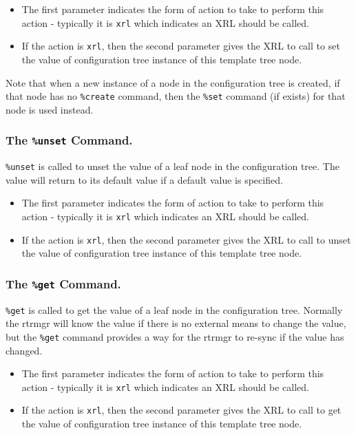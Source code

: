 \documentclass[11pt]{article}
\begin{document}
\begin{itemize}

  \item The first parameter indicates the form of action to take to perform
this action - typically it is {\tt xrl} which indicates an XRL should
be called.

  \item If the action is {\tt xrl}, then the second parameter gives the XRL to
call to set the value of configuration tree instance of this template
tree node.

\end{itemize}

Note that when a new instance of a node in the configuration tree is created,
if that node has no {\tt \%create} command, then the {\tt \%set}
command (if exists) for that node is used instead.

\subsubsection{The {\tt \%unset} Command.}
{\tt \%unset} is called to unset the value of a leaf node in the
configuration tree.  The value will return to its default value if a
default value is specified.

\begin{itemize}
  \item The first parameter indicates the form of action to take to perform
this action - typically it is {\tt xrl} which indicates an XRL should
be called.

  \item If the action is {\tt xrl}, then the second parameter gives the XRL to
call to unset the value of configuration tree instance of this template
tree node.

\end{itemize}

\subsubsection{The {\tt \%get} Command.}
{\tt \%get} is called to get the value of a leaf node in the
configuration tree.  Normally the rtrmgr will know the value if there
is no external means to change the value, but the {\tt \%get} command
provides a way for the rtrmgr to re-sync if the value has changed.

\begin{itemize}
  \item The first parameter indicates the form of action to take to perform
this action - typically it is {\tt xrl} which indicates an XRL should
be called.

  \item If the action is {\tt xrl}, then the second parameter gives the XRL to
call to get the value of configuration tree instance of this template
tree node.

\end{itemize}
\end{document}
